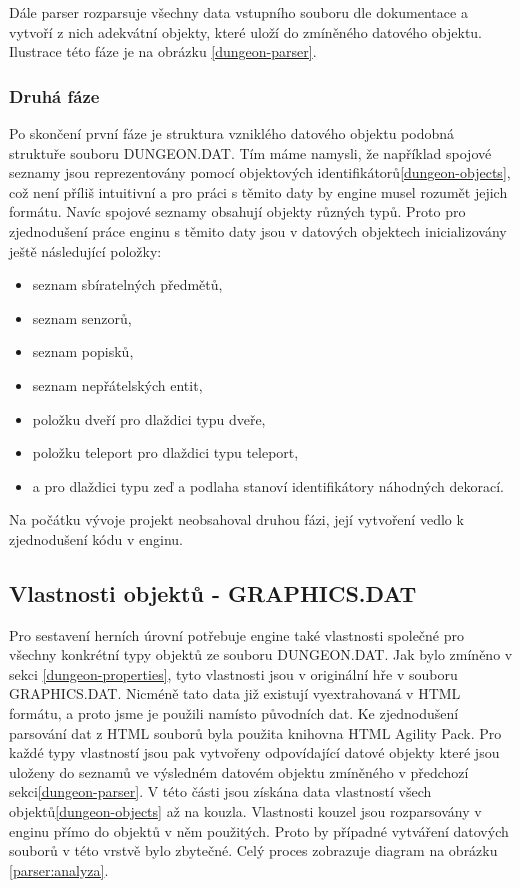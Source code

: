 Dále parser rozparsuje všechny data vstupního souboru dle dokumentace\cite{TechnicalDocumentationFontanel05} a vytvoří z nich 
adekvátní objekty, které uloží do zmíněného datového objektu. Ilustrace této fáze je na obrázku \ref{dungeon-parser}.

\subsubsection{Druhá fáze}
Po skončení první fáze je struktura vzniklého datového objektu podobná struktuře souboru DUNGEON.DAT. Tím máme namysli, že
například spojové seznamy jsou reprezentovány pomocí objektových identifikátorů\vref{dungeon-objects}, což není příliš intuitivní a pro práci 
s těmito daty by engine musel rozumět jejich formátu. Navíc spojové seznamy obsahují objekty různých typů. Proto pro zjednodušení práce enginu
s těmito daty jsou v datových objektech inicializovány ještě následující položky: 
\begin{itemize} 
\item seznam sbíratelných předmětů,
\item seznam senzorů,
\item seznam popisků,
\item seznam nepřátelských entit,
\item položku dveří pro dlaždici typu dveře,
\item položku teleport pro dlaždici typu teleport,
\item a pro dlaždici typu zeď a podlaha stanoví identifikátory náhodných dekorací.
\end{itemize} 

Na počátku vývoje projekt neobsahoval druhou fázi, její vytvoření vedlo k zjednodušení kódu v enginu.

\subsection{Vlastnosti objektů - GRAPHICS.DAT}

Pro sestavení herních úrovní potřebuje engine také vlastnosti společné pro všechny konkrétní typy objektů ze
souboru DUNGEON.DAT. Jak bylo zmíněno v sekci \ref{dungeon-properties}, tyto vlastnosti jsou v originální hře v souboru GRAPHICS.DAT.
Nicméně tato data již existují vyextrahovaná v HTML formátu, a proto jsme je použili namísto původních dat.
Ke zjednodušení parsování dat z HTML souborů byla
použita knihovna HTML Agility Pack\cite{HtmlAgilityPack}. Pro každé typy vlastností jsou pak vytvořeny odpovídající datové objekty
které jsou uloženy do seznamů ve výsledném datovém objektu zmíněného v předchozí
sekci\ref{dungeon-parser}. V této části jsou získána data vlastností všech objektů\vref{dungeon-objects} až na kouzla.
Vlastnosti kouzel jsou rozparsovány v enginu přímo do objektů v něm použitých. Proto by případné vytváření datových souborů
v této vrstvě bylo zbytečné. Celý proces zobrazuje diagram na obrázku \ref{parser:analyza}.


